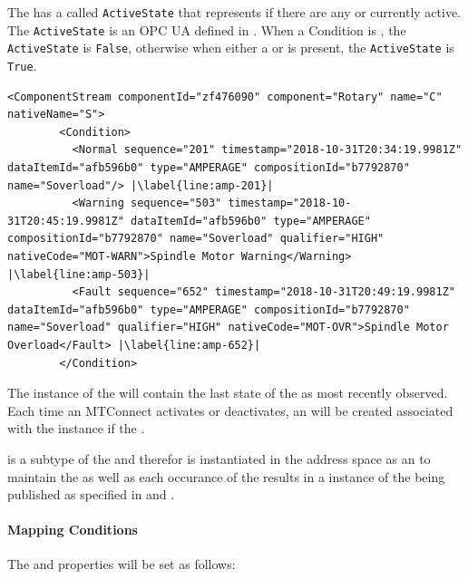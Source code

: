 The  has a  called \texttt{ActiveState} that represents if there are any  or  currently active. The \texttt{ActiveState} is an OPC UA   defined in \cite{UAPart8}. When a Condition is , the \texttt{ActiveState} is \texttt{False}, otherwise when either a  or  is present, the \texttt{ActiveState} is \texttt{True}.

\begin{lstlisting}[firstnumber=last,escapechar=|,%
    caption={Rotary C Component Stream},label={lst:rotary-component-stream}]
      <ComponentStream componentId="zf476090" component="Rotary" name="C" nativeName="S">
        <Condition>
          <Normal sequence="201" timestamp="2018-10-31T20:34:19.9981Z" dataItemId="afb596b0" type="AMPERAGE" compositionId="b7792870" name="Soverload"/> |\label{line:amp-201}|
          <Warning sequence="503" timestamp="2018-10-31T20:45:19.9981Z" dataItemId="afb596b0" type="AMPERAGE" compositionId="b7792870" name="Soverload" qualifier="HIGH" nativeCode="MOT-WARN">Spindle Motor Warning</Warning> |\label{line:amp-503}|
          <Fault sequence="652" timestamp="2018-10-31T20:49:19.9981Z" dataItemId="afb596b0" type="AMPERAGE" compositionId="b7792870" name="Soverload" qualifier="HIGH" nativeCode="MOT-OVR">Spindle Motor Overload</Fault> |\label{line:amp-652}|
        </Condition>
\end{lstlisting}

The instance of the  will contain the last state of the  as most recently observed. Each time an MTConnect  activates or deactivates, an   will be created associated with the instance if the  . 

 is a subtype of the  and therefor is instantiated in the address space as an  to maintain the  as well as each occurance of the  results in a instance of the  being published as specified in \cite{UAPart3} and \cite{UAPart9}.

\paragraph{Mapping Conditions}

The  and  properties will be set as follows:

